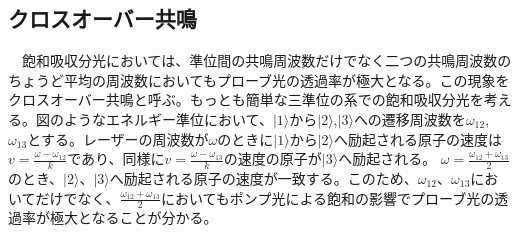 \documentclass[uplatex, dvipdfmx, a4paper, report, papersize, 11pt]{jsbook}
\begin{document}
\subsection{クロスオーバー共鳴}
　飽和吸収分光においては、準位間の共鳴周波数だけでなく二つの共鳴周波数のちょうど平均の周波数においてもプローブ光の透過率が極大となる。この現象をクロスオーバー共鳴と呼ぶ。もっとも簡単な三準位の系での飽和吸収分光を考える。図のようなエネルギー準位において、$|1\rangle$から$|2\rangle$,$|3\rangle$への遷移周波数を$\omega_{12}$, $\omega_{13}$とする。レーザーの周波数が$\omega$のときに$|1\rangle$から$|2\rangle$へ励起される原子の速度は$v = \frac{\omega - \omega_{12}}{k}$であり、同様に$v = \frac{\omega - \omega_{13}}{k}$の速度の原子が$|3\rangle$へ励起される。
$\omega = \frac{\omega_{12} + \omega_{13}}{2}$のとき、$|2\rangle$、$|3\rangle$へ励起される原子の速度が一致する。このため、$\omega_12$、$\omega_13$においてだけでなく、$\frac{\omega_{12} + \omega_{13}}{2}$においてもポンプ光による飽和の影響でプローブ光の透過率が極大となることが分かる。
\end{document}
